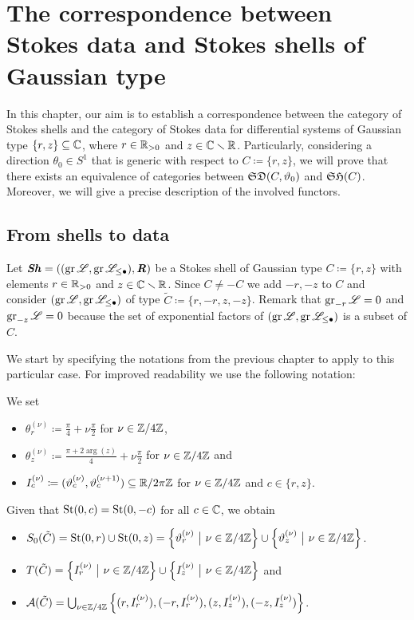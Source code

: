 \chapter{The correspondence between Stokes data and Stokes shells of Gaussian type}

In this chapter, our aim is to establish a correspondence between the category of Stokes shells and the category of Stokes data for differential systems of Gaussian type $\{r,z\} \subseteq \mathbb{C}$, where $r \in \mathbb{R}_{>0}$ and $z\in \mathbb{C}\smallsetminus \mathbb{R}$. Particularly, considering a direction $\theta_0 \in S^1$ that is generic with respect to $C \coloneqq \{r,z\}$, we will prove that there exists an equivalence of categories between $\mathfrak{SD}(C,\vartheta_0)$ and $\mathfrak{SH}(C)$. Moreover, we will give a precise description of the involved functors. 

\section{From shells to data}\label{ShellData}
Let $\bm{\mathit{Sh}}=((\operatorname{gr}\mathscr{L}, \operatorname{gr}\mathscr{L}_{\leq \bullet}), \bm{\mathit{R}})$ be a Stokes shell of Gaussian type $C \coloneqq \{r,z\}$ with elements $r \in \mathbb{R}_{>0}$ and $z \in \mathbb{C}\smallsetminus\mathbb{R}$.
Since $C \neq -C$ we add $-r,-z$ to $C$ and consider $(\operatorname{gr}\mathscr{L}, \operatorname{gr}\mathscr{L}_{\leq \bullet})$ of type $\tilde{C}\coloneqq \{r,-r,z,-z\}$. Remark that $\operatorname{gr}_{-r}\mathscr{L} = 0$ and $\operatorname{gr}_{-z}\mathscr{L} = 0$ because the set of exponential factors of $(\operatorname{gr}\mathscr{L}, \operatorname{gr}\mathscr{L}_{\leq \bullet})$ is a subset of $C$. 

We start by specifying the notations from the previous chapter to apply to this particular case. For improved readability we use the following notation:
\begin{nota}
    We set
    \begin{itemize}
        \item $\theta_r^{(\nu)} \coloneqq \frac{\pi}{4}+ \nu \frac{\pi}{2} $ for $\nu \in \mathbb{Z}/4\mathbb{Z}$,
        \item $\theta_z^{(\nu)} \coloneqq \frac{\pi+ 2\arg(z)}{4}+ \nu\frac{\pi}{2}$ for $\nu \in \mathbb{Z}/4\mathbb{Z}$ and 
        \item $I_c^{(\nu)} \coloneqq (\vartheta_{c}^{(\nu)},\vartheta_{c}^{(\nu+1)}) \subseteq \mathbb{R}/2\pi\mathbb{Z}$ for $\nu \in \mathbb{Z}/4\mathbb{Z}$ and $c \in \{r,z\}$.
    \end{itemize}
\end{nota}

Given that $\operatorname{St}(0,c) = \operatorname{St}(0,-c)$ for all $c \in \mathbb{C}$, we obtain
\begin{itemize}
    \item $S_0(\tilde{C})= \operatorname{St}(0,r) \cup \operatorname{St}(0,z)= \left\{\vartheta_r^{(\nu)} ~\big\vert~ \nu \in \mathbb{Z} /4\mathbb{Z}\right\} \cup \left\{\vartheta_z^{(\nu)} ~\big\vert~ \nu \in \mathbb{Z}/4\mathbb{Z}\right\}$. 
    \item $T(\tilde{C}) = \left\{I_r^{(\nu)} ~\big\vert~ \nu \in \mathbb{Z}/4\mathbb{Z}\right\} \cup \left\{I_z^{(\nu)} ~\big\vert~ \nu \in \mathbb{Z}/4\mathbb{Z}\right\}$ and
    \item $\mathcal{A}(\tilde{C}) = \bigcup_{\nu \in \mathbb{Z}/4\mathbb{Z}} \left\{(r, I_r^{(\nu)}), (-r, I_r^{(\nu)}), (z, I_z^{(\nu)}), (-z, I_z^{(\nu)}) \right\}$.
\end{itemize}

